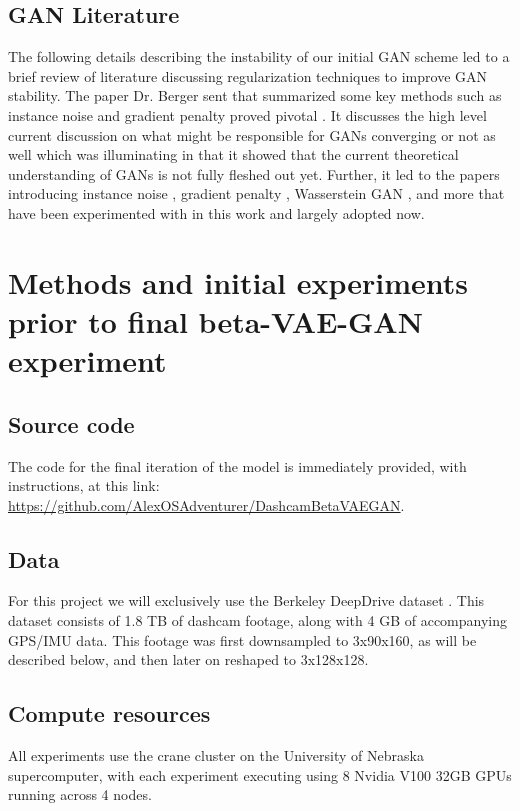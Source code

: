 \documentclass{article}
\begin{document}
\subsection{GAN Literature}
The following details describing the instability of our initial GAN scheme led to a brief review of literature discussing regularization techniques to improve GAN stability. The paper Dr. Berger sent that summarized some key methods such as instance noise and gradient penalty proved pivotal \cite{mescheder2018training}. It discusses the high level current discussion on what might be responsible for GANs converging or not as well which was illuminating in that it showed that the current theoretical understanding of GANs is not fully fleshed out yet. Further, it led to the papers introducing instance noise \cite{sonderby2016amortised} \cite{nagarajan2017gradient}, gradient penalty \cite{roth2017stabilizing}, Wasserstein GAN \cite{arjovsky2017wasserstein}, and more that have been experimented with in this work and largely adopted now.
\section{Methods and initial experiments prior to final beta-VAE-GAN experiment}
\subsection{Source code}
The code for the final iteration of the model is immediately provided, with instructions, at this link: \url{https://github.com/AlexOSAdventurer/DashcamBetaVAEGAN}.
\subsection{Data}
For this project we will exclusively use the Berkeley DeepDrive dataset \cite{yu2018bdd100k}. This dataset consists of 1.8 TB of dashcam footage, along with 4 GB of accompanying GPS/IMU data. This footage was first downsampled to 3x90x160, as will be described below, and then later on reshaped to 3x128x128.
\subsection{Compute resources}
All experiments use the crane cluster on the University of Nebraska supercomputer, with each experiment executing using 8 Nvidia V100 32GB GPUs running across 4 nodes.
\end{document}

